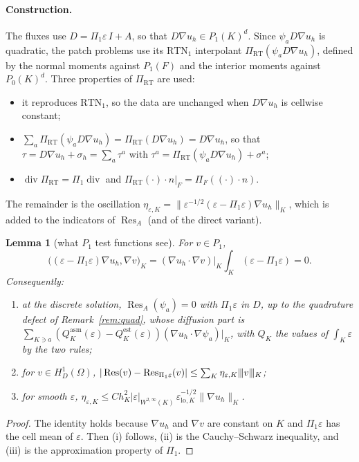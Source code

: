 \documentclass[11pt]{article}
\newcommand{\tnorm}[1]{\lvert\kern-0.25ex\lvert\kern-0.25ex\lvert #1\rvert\kern-0.25ex\rvert\kern-0.25ex\rvert}
\newcommand{\eps}{\varepsilon}
\newcommand{\Res}{\operatorname{Res}}
\newcommand{\RT}{\mathrm{RT}}
\newcommand{\RTN}{\mathrm{RTN}_1}
\newcommand{\dv}{\operatorname{div}}
\theoremstyle{plain}
\newtheorem{lemma}[theorem]{Lemma}
\theoremstyle{remark}
\numberwithin{equation}{section}
\begin{document}
\paragraph{Construction.} The fluxes use $D=\Pi_1\eps\,I+A$, so that $D\nabla u_h\in P_1(K)^d$.
Since $\psi_aD\nabla u_h$ is quadratic, the patch problems use its $\RTN$ interpolant
$\Pi_{\RT}(\psi_aD\nabla u_h)$, defined by the normal moments against $P_1(F)$ and the interior
moments against $P_0(K)^d$. Three properties of $\Pi_{\RT}$ are used:
\begin{itemize}
  \item it reproduces $\RTN$, so the data are unchanged when $D\nabla u_h$ is cellwise constant;
  \item $\sum_a\Pi_{\RT}(\psi_aD\nabla u_h)=\Pi_{\RT}(D\nabla u_h)=D\nabla u_h$, so that
  $\tau=D\nabla u_h+\sigma_h=\sum_a\tau^a$ with $\tau^a=\Pi_{\RT}(\psi_aD\nabla u_h)+\sigma^a$;
  \item $\dv\Pi_{\RT}=\Pi_1\dv$ and $\Pi_{\RT}(\cdot)\cdot n|_F=\Pi_F((\cdot)\cdot n)$.
\end{itemize}
The remainder is the oscillation
$\eta_{\eps,K}=\|\eps^{-1/2}(\eps-\Pi_1\eps)\nabla u_h\|_K$, which is added to the indicators of
$\Res_A$ (and of the direct variant).

\begin{lemma}[what $P_1$ test functions see]\label{lem:V}
For $v\in P_1$,
\[
  \bigl((\eps-\Pi_1\eps)\nabla u_h,\nabla v\bigr)_K=(\nabla u_h\cdot\nabla v)|_K\int_K(\eps-\Pi_1\eps)=0.
\]
Consequently:
\begin{enumerate}[label=(\roman*)]
  \item at the discrete solution, $\Res_A(\psi_a)=0$ with $\Pi_1\eps$ in $D$, up to the quadrature
  defect of Remark~\ref{rem:quad}, whose diffusion part is
  $\sum_{K\ni a}(Q_K^{\mathrm{asm}}(\eps)-Q_K^{\mathrm{est}}(\eps))(\nabla u_h\cdot\nabla\psi_a)|_K$,
  with $Q_K$ the values of $\int_K\eps$ by the two rules;
  \item for $v\in H^1_D(\Omega)$, $|\Res(v)-\Res_{\Pi_1\eps}(v)|\le\sum_K\eta_{\eps,K}\tnorm{v}_K$;
  \item for smooth $\eps$,
  $\eta_{\eps,K}\le Ch_K^2|\eps|_{W^{2,\infty}(K)}\,\eps_{\mathrm{lo},K}^{-1/2}\|\nabla u_h\|_K$.
\end{enumerate}
\end{lemma}

\begin{proof}
The identity holds because $\nabla u_h$ and $\nabla v$ are constant on $K$ and $\Pi_1\eps$ has the
cell mean of $\eps$. Then (i) follows, (ii) is the Cauchy--Schwarz inequality, and (iii) is the
approximation property of $\Pi_1$.
\end{proof}
\end{document}
